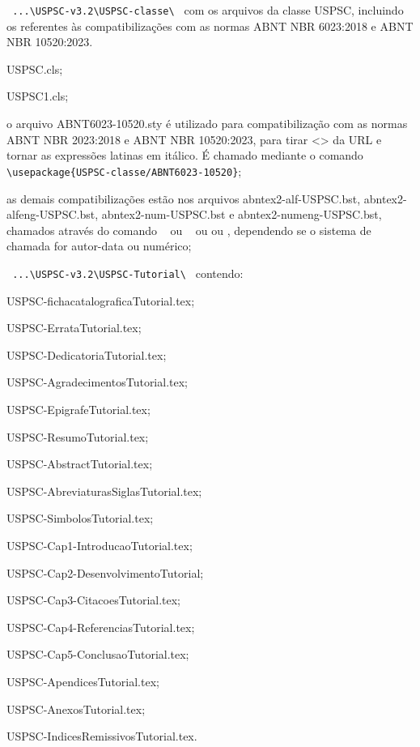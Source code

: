 \begin{alineas}
	\item \verb+ ...\USPSC-v3.2\USPSC-classe\ + com os arquivos da classe USPSC, incluindo os referentes às compatibilizações com as normas ABNT NBR 6023:2018 e ABNT NBR 10520:2023.
		\begin{alineas}
			\item USPSC.cls;
			\item USPSC1.cls; 
			\item o arquivo ABNT6023-10520.sty  é utilizado para compatibilização com as normas  ABNT NBR 2023:2018 e ABNT NBR 10520:2023, para tirar <> da URL e tornar as expressões latinas em itálico. É chamado mediante o comando  \verb+ \usepackage{USPSC-classe/ABNT6023-10520}+;
			\item as demais compatibilizações estão nos arquivos abntex2-alf-USPSC.bst, abntex2-alfeng-USPSC.bst, abntex2-num-USPSC.bst e abntex2-numeng-USPSC.bst, chamados através do comando \newline \verb+ + ou \newline
			\verb+ + ou \newline
			\verb++ ou \newline \verb++, dependendo se o sistema de chamada for autor-data ou numérico; 
		\end{alineas}	
	    
	\item \verb+ ...\USPSC-v3.2\USPSC-Tutorial\ + contendo:
		\begin{subalineas}
			\item USPSC-fichacatalograficaTutorial.tex;
			\item USPSC-ErrataTutorial.tex;
			\item USPSC-DedicatoriaTutorial.tex;
			\item USPSC-AgradecimentosTutorial.tex;
			\item USPSC-EpigrafeTutorial.tex;
			\item USPSC-ResumoTutorial.tex;
			\item USPSC-AbstractTutorial.tex;
			\item USPSC-AbreviaturasSiglasTutorial.tex;
			\item USPSC-SimbolosTutorial.tex;
			\item USPSC-Cap1-IntroducaoTutorial.tex;
			\item USPSC-Cap2-DesenvolvimentoTutorial;
			\item USPSC-Cap3-CitacoesTutorial.tex;
			\item USPSC-Cap4-ReferenciasTutorial.tex;
			\item USPSC-Cap5-ConclusaoTutorial.tex;
			\item USPSC-ApendicesTutorial.tex;
			\item USPSC-AnexosTutorial.tex;
			\item USPSC-IndicesRemissivosTutorial.tex.
		\end{subalineas}
	

\end{alineas}

